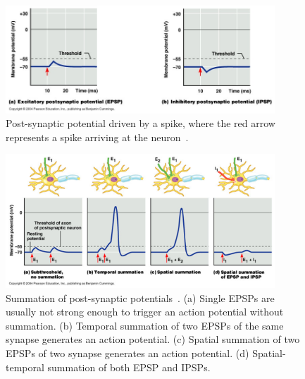 
\begin{figure}[tb!]
	\centering
	\includegraphics[width=0.9\textwidth]{pics_snn/EI_PSP.JPG}
	\caption{Post-synaptic potential driven by a spike, where the red arrow represents a spike arriving at the neuron~\cite{marieb2007human}.}
	\label{Fig:psp}
\end{figure}

\begin{figure}[bt!]
	\centering
	\includegraphics[width=0.9\textwidth]{pics_snn/PSP.png}
	\caption{Summation of post-synaptic potentials~\cite{reece2011campbell}. 
		(a) Single EPSPs are usually not strong enough to trigger an action potential without summation. (b) Temporal summation of two EPSPs of the same synapse generates an action potential. (c) Spatial summation of two EPSPs of two synapse generates an action potential. (d) Spatial-temporal summation of both EPSP and IPSPs.
	}
	\label{Fig:psp_sum}
\end{figure}

